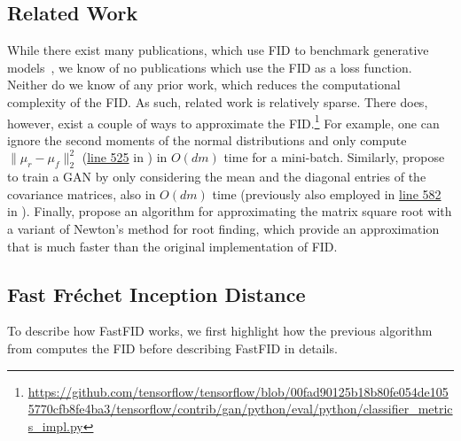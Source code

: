 \documentclass[11pt,a4paper,twoside,openright,final]{memoir}
\makeatletter
\newcommand\footnoteref[1]{\protected@xdef\@thefnmark{\ref{#1}}\@footnotemark}
\makeatother
\begin{document}
\subsection{Related Work}
While there exist many publications, which use FID to benchmark generative models~\cite{fid-comparison, saganfid, biggan, dcgan}, we know of no publications which use the FID as a loss function.
Neither do we know of any prior work, which reduces the computational complexity of the FID.
As such, related work is relatively sparse.
There does, however, exist a couple of ways to approximate the FID.\footnote{\label{fn:tf}\url{https://github.com/tensorflow/tensorflow/blob/00fad90125b18b80fe054de1055770cfb8fe4ba3/tensorflow/contrib/gan/python/eval/python/classifier_metrics_impl.py}}
For example, one can ignore the second moments of the normal distributions and only compute $\|\mu_r-\mu_f\|_2^2$ (\href{https://github.com/tensorflow/tensorflow/blob/00fad90125b18b80fe054de1055770cfb8fe4ba3/tensorflow/contrib/gan/python/eval/python/classifier_metrics_impl.py#L525}{line 525} in \footnoteref{fn:tf}) in $O(dm)$ time for a mini-batch.
Similarly, \citet{approximate-fid} propose to train a GAN by only considering the mean and the diagonal entries of the covariance matrices, also in $O(dm)$ time (previously also employed in \href{https://github.com/tensorflow/tensorflow/blob/00fad90125b18b80fe054de1055770cfb8fe4ba3/tensorflow/contrib/gan/python/eval/python/classifier_metrics_impl.py#L582}{line 582} in \footnoteref{fn:tf}).
Finally, \citet{fid-approx} propose an algorithm for approximating the matrix square root with a variant of Newton's method for root finding, which provide an approximation that is much faster than the original implementation of FID.


\subsection{Fast Fr\'echet Inception Distance} 
To describe how FastFID works, we first highlight how the previous algorithm from \cite{fid} computes the FID before describing FastFID in details.
\end{document}
